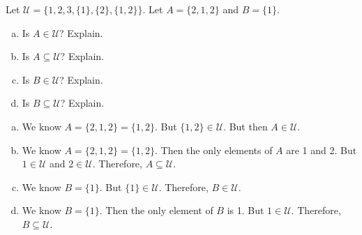 \documentclass[11pt,letterpaper]{article}
\begin{document}
\newpage





 Let $\mathscr{U}= \{ 1, 2, 3, \{1\}, \{2\}, \{1,2\} \}$. Let $A= \{ 2, 1, 2 \}$ and $B= \{ 1 \}$. 
	\begin{enumerate}[(a)]
	\item Is $A \in \mathscr{U}$? Explain.
	\item Is $A \subseteq \mathscr{U}$? Explain.
	\item Is $B \in \mathscr{U}$? Explain. 
	\item Is $B \subseteq \mathscr{U}$? Explain. 
	\end{enumerate} \pspace

\sol 
\begin{enumerate}[(a)]
\item We know $A= \{ 2, 1, 2 \}= \{ 1, 2 \}$. But $\{ 1, 2 \} \in \mathscr{U}$. But then $A \in \mathscr{U}$. 

\item We know $A= \{ 2, 1, 2 \}= \{ 1, 2 \}$. Then the only elements of $A$ are 1 and 2. But $1 \in \mathscr{U}$ and $2 \in \mathscr{U}$. Therefore, $A \subseteq \mathscr{U}$. 

\item We know $B= \{ 1 \}$. But $\{ 1 \} \in \mathscr{U}$. Therefore, $B \in \mathscr{U}$. 

\item We know $B= \{ 1 \}$. Then the only element of $B$ is 1. But $1 \in \mathscr{U}$. Therefore, $B \subseteq \mathscr{U}$. 
\end{enumerate}





\newpage
\end{document}
